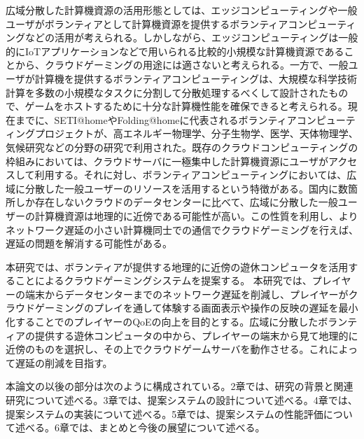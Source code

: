 広域分散した計算機資源の活用形態としては、エッジコンピューティングや一般ユーザがボランティアとして計算機資源を提供するボランティアコンピューティングなどの活用が考えられる。しかしながら、エッジコンピューティングは一般的にIoTアプリケーションなどで用いられる比較的小規模な計算機資源であることから、クラウドゲーミングの用途には適さないと考えられる。一方で、一般ユーザが計算機を提供するボランティアコンピューティングは、大規模な科学技術計算を多数の小規模なタスクに分割して分散処理するべくして設計されたもので、ゲームをホストするために十分な計算機性能を確保できると考えられる。現在までに、SETI@home\cite{setiathome}やFolding@home\cite{folding}に代表されるボランティアコンピューティングプロジェクトが、高エネルギー物理学、分子生物学、医学、天体物理学、気候研究などの分野の研究で利用された。既存のクラウドコンピューティングの枠組みにおいては、クラウドサーバに一極集中した計算機資源にユーザがアクセスして利用する。それに対し、ボランティアコンピューティングにおいては、広域に分散した一般ユーザーのリソースを活用するという特徴がある。国内に数箇所しか存在しないクラウドのデータセンターに比べて、広域に分散した一般ユーザーの計算機資源は地理的に近傍である可能性が高い。この性質を利用し、よりネットワーク遅延の小さい計算機同士での通信でクラウドゲーミングを行えば、遅延の問題を解消する可能性がある。

本研究では、ボランティアが提供する地理的に近傍の遊休コンピュータを活用することによるクラウドゲーミングシステムを提案する。
本研究では、プレイヤーの端末からデータセンターまでのネットワーク遅延を削減し、プレイヤーがクラウドゲーミングのプレイを通して体験する画面表示や操作の反映の遅延を最小化することでのプレイヤーのQoEの向上を目的とする。広域に分散したボランティアの提供する遊休コンピュータの中から、プレイヤーの端末から見て地理的に近傍のものを選択し、その上でクラウドゲームサーバを動作させる。これによって遅延の削減を目指す。

本論文の以後の部分は次のように構成されている。2章では、研究の背景と関連研究について述べる。3章では、提案システムの設計について述べる。4章では、提案システムの実装について述べる。5章では、提案システムの性能評価について述べる。6章では、まとめと今後の展望について述べる。







 
